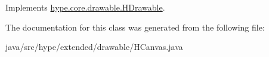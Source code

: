 Implements \hyperlink{classhype_1_1core_1_1drawable_1_1_h_drawable_ae06fef8620c103f6656b9c57a1f0dacd}{hype.\-core.\-drawable.\-H\-Drawable}.



The documentation for this class was generated from the following file\-:\begin{DoxyCompactItemize}
\item 
java/src/hype/extended/drawable/H\-Canvas.\-java\end{DoxyCompactItemize}
